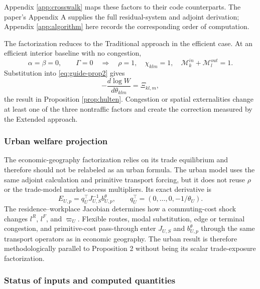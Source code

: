 Appendix \ref{app:crosswalk} maps these factors to their code counterparts.
The paper's Appendix A supplies the full residual-system and adjoint
derivation; Appendix \ref{app:algorithm} here records the corresponding order
of computation.

The factorization reduces to the Traditional approach in the efficient case. At
an efficient interior baseline with no congestion,
\[
 \alpha=\beta=0,\qquad \Gamma=0
 \quad\Longrightarrow\quad
 \rho=1,\quad
 \chi_{klm}=1,\quad
 \mathcal M_k^{in}+\mathcal M_l^{out}=1.
\]
Substitution into \eqref{eq:guide-prop2} gives
\[
 -\frac{d\log W}{d\theta_{klm}}=\Xi_{kl,m},
\]
the result in Proposition \ref{prop:hulten}. Congestion or spatial externalities
change at least one of the three nontraffic factors and create the correction
measured by the Extended approach.

\subsubsection{Urban welfare projection}

The economic-geography factorization relies on its trade equilibrium and
therefore should not be relabeled as an urban formula. The urban model uses
the same adjoint calculation and primitive transport forcing, but it does not
reuse \(\rho\) or the trade-model market-access multipliers. Its exact
derivative is
\[
 E_{U,p}
 =q_U^\top J_{U,S}^{-1}b_{U,p}^{\theta},
 \qquad
 q_U^\top=(0,\ldots,0,-1/\theta_U).
\]
The residence--workplace Jacobian determines how a commuting-cost shock
changes \(l^R\), \(l^F\), and \(\varpi_U\). Flexible routes, modal substitution,
edge or terminal congestion, and primitive-cost pass-through enter
\(J_{U,S}\) and \(b_{U,p}^{\theta}\) through the same transport operators as
in economic geography. The urban result is therefore methodologically
parallel to Proposition 2 without being its scalar trade-exposure
factorization.

\subsubsection{Status of inputs and computed quantities}
\label{sec:object-status}

